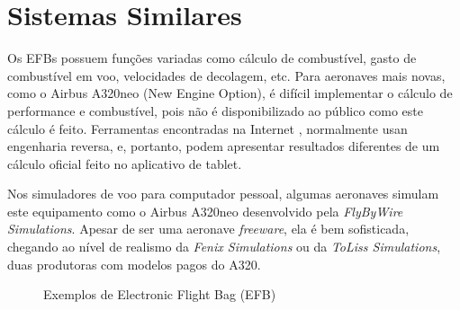 \chapter{Sistemas Similares}
Os EFBs possuem funções variadas como cálculo de combustível, gasto de combustível
em voo, velocidades de decolagem, etc. \cite{wired-efb} Para aeronaves mais novas, como o Airbus 
A320neo (New Engine Option), é difícil implementar o cálculo de performance e combustível, pois não 
é disponibilizado ao público como este cálculo é feito. Ferramentas encontradas 
na Internet \cite{a320-perf}, normalmente usan engenharia reversa, e, portanto, 
podem apresentar resultados diferentes de um cálculo oficial feito no aplicativo
de tablet.

Nos simuladores de voo para computador pessoal, algumas aeronaves simulam
este equipamento como o Airbus A320neo desenvolvido pela \textit{FlyByWire Simulations}. 
Apesar de ser uma aeronave \textit{freeware}, ela é bem sofisticada, chegando ao 
nível de realismo da \textit{Fenix Simulations} ou da \textit{ToLiss Simulations}, 
duas produtoras com modelos pagos do A320.

\begin{figure}%
    \centering
    \qquad

    \caption{Exemplos de Electronic Flight Bag (EFB)}
    
    \label{fig:example}%
\end{figure}

